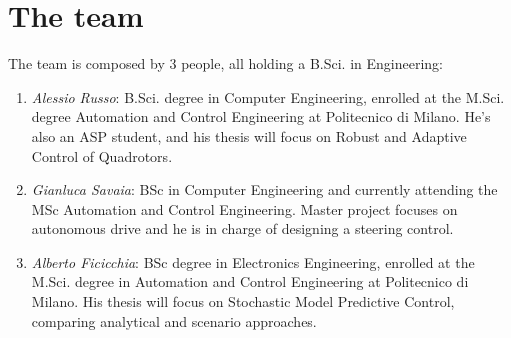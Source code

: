 \chapter*{The team}

The team is composed by 3 people, all holding a B.Sci. in Engineering: 
\begin{enumerate}
\item \emph{Alessio Russo}: B.Sci. degree in Computer Engineering, enrolled at the M.Sci. degree Automation and Control Engineering at Politecnico di Milano. He's also an ASP student, and his thesis will focus on Robust and Adaptive Control of Quadrotors.
\item \emph{Gianluca Savaia}: BSc in Computer Engineering and currently attending the MSc Automation and Control Engineering. Master project focuses on autonomous drive and he is in charge of designing a steering control.

\item \emph{Alberto Ficicchia}: BSc degree in Electronics Engineering, enrolled at the M.Sci. degree in Automation and Control Engineering at Politecnico di Milano. His thesis will focus on Stochastic Model Predictive Control, comparing analytical and scenario approaches.
\end{enumerate}